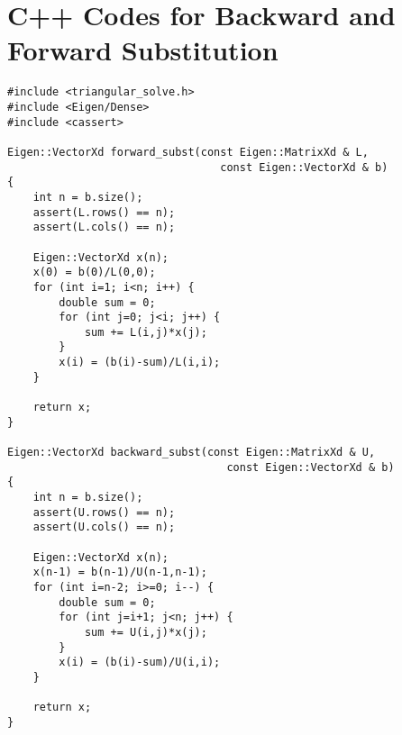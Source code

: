 \documentclass[paper=a4, fontsize=11pt]{scrartcl} %
\numberwithin{equation}{section} %
\numberwithin{figure}{section} %
\numberwithin{table}{section} %
\begin{document}
\newpage
\section{C++ Codes for Backward and Forward Substitution}

\begin{lstlisting}
#include <triangular_solve.h>
#include <Eigen/Dense>
#include <cassert>

Eigen::VectorXd forward_subst(const Eigen::MatrixXd & L,
                                 const Eigen::VectorXd & b)
{
    int n = b.size();
    assert(L.rows() == n);
    assert(L.cols() == n);

    Eigen::VectorXd x(n);
    x(0) = b(0)/L(0,0);
    for (int i=1; i<n; i++) {
        double sum = 0;
        for (int j=0; j<i; j++) {
            sum += L(i,j)*x(j);
        }
        x(i) = (b(i)-sum)/L(i,i);
    }

    return x;
}

Eigen::VectorXd backward_subst(const Eigen::MatrixXd & U,
                                  const Eigen::VectorXd & b)
{
    int n = b.size();
    assert(U.rows() == n);
    assert(U.cols() == n);

    Eigen::VectorXd x(n);
    x(n-1) = b(n-1)/U(n-1,n-1);
    for (int i=n-2; i>=0; i--) {
        double sum = 0;
        for (int j=i+1; j<n; j++) {
            sum += U(i,j)*x(j);
        }
        x(i) = (b(i)-sum)/U(i,i);
    }

    return x;
}
\end{lstlisting}

\newpage
\end{document}
